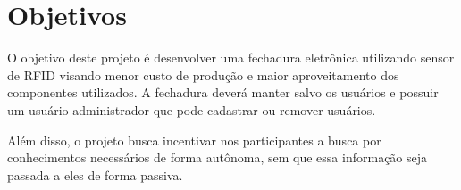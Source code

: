 \chapter{Objetivos}

O objetivo deste projeto é desenvolver uma fechadura
eletrônica utilizando sensor de RFID visando menor
custo de produção e maior aproveitamento dos componentes
utilizados. A fechadura deverá manter salvo os usuários e
possuir um usuário administrador que pode cadastrar ou remover usuários.

Além disso, o projeto busca incentivar nos participantes a busca por
conhecimentos necessários de forma autônoma, sem que essa informação seja passada a
eles de forma passiva. 